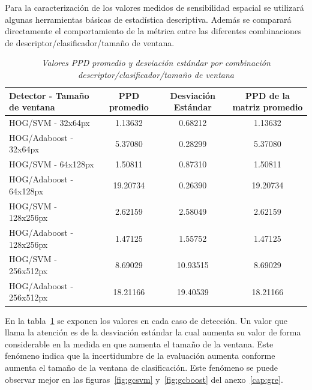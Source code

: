 Para la caracterización de los valores medidos de sensibilidad espacial se utilizará algunas herramientas básicas de estadística descriptiva. Además se comparará directamente el comportamiento de la métrica entre las diferentes combinaciones de descriptor/clasificador/tamaño de ventana.


\begin{table}[h]
\centering
\caption{\em  Valores PPD promedio y desviación estándar por combinación \\ descriptor/clasificador/tamaño de ventana}  \label{tab:promgeneral}
\resizebox{15cm}{!} {
\begin{tabular}{|l|c|c|c|}
\hline
\rowcolor[HTML]{C0C0C0} 
Detector  -  Tamaño de ventana & PPD promedio & Desviación Estándar & PPD de la matriz promedio       \\ \hline
HOG/SVM - 32x64px              & 1.13632      & 0.68212             & \cellcolor[HTML]{FFFFFF}1.13632 \\ \hline
\rowcolor[HTML]{EFEFEF} 
HOG/Adaboost - 32x64px         & 5.37080      & 0.28299             & 5.37080                         \\ \hline
HOG/SVM - 64x128px             & 1.50811      & 0.87310             & 1.50811                         \\ \hline
\rowcolor[HTML]{EFEFEF} 
HOG/Adaboost - 64x128px        & 19.20734     & 0.26390             & 19.20734                        \\ \hline
HOG/SVM - 128x256px            & 2.62159      & 2.58049             & 2.62159                         \\ \hline
\rowcolor[HTML]{EFEFEF} 
HOG/Adaboost - 128x256px       & 1.47125      & 1.55752             & 1.47125                         \\ \hline
HOG/SVM - 256x512px            & 8.69029      & 10.93515            & 8.69029                         \\ \hline
\rowcolor[HTML]{EFEFEF} 
HOG/Adaboost - 256x512px       & 18.21166     & 19.40539            & 18.21166                        \\ \hline
\end{tabular}}
\end{table}

En la tabla~\ref{tab:promgeneral} se exponen los valores en cada caso de detección. Un valor que llama la atención es de la desviación estándar la cual aumenta su valor de forma considerable en la medida en que aumenta el tamaño de la ventana. Este fenómeno indica que la incertidumbre de la evaluación aumenta conforme aumenta el tamaño de la ventana de clasificación. Este fenómeno se puede observar mejor en las figuras~\ref{fig:gcsvm} y~\ref{fig:gcboost} del anexo~\ref{cap:gre}.

